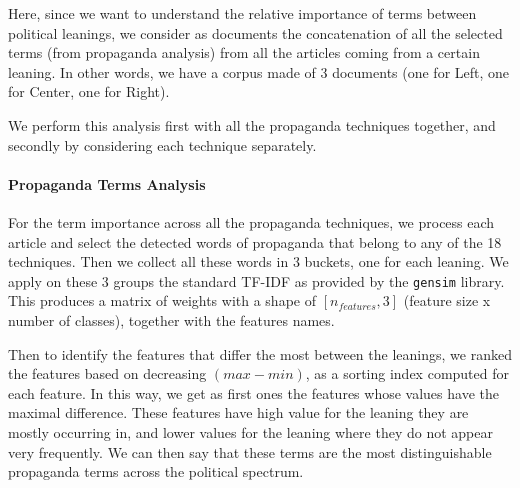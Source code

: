 Here, since we want to understand the relative importance of terms between political leanings, we consider as documents the concatenation of all the selected terms (from propaganda analysis) from all the articles coming from a certain leaning. In other words, we have a corpus made of 3 documents (one for Left, one for Center, one for Right).

We perform this analysis first with all the propaganda techniques together, and secondly by considering each technique separately.

\paragraph{Propaganda Terms Analysis}
For the term importance across all the propaganda techniques, we process each article and select the detected words of propaganda that belong to any of the 18 techniques. Then we collect all these words in 3 buckets, one for each leaning.
We apply on these 3 groups the standard TF-IDF as provided by the \texttt{gensim} library. %
This produces a matrix of weights with a shape of $[n_{features}, 3]$ (feature size x number of classes), together with the features names.

Then to identify the features that differ the most between the leanings, we ranked the features based on decreasing $(max - min)$, as a sorting index computed for each feature. In this way, we get as first ones the features whose values have the maximal difference.
These features have high value for the leaning they are mostly occurring in, and lower values for the leaning where they do not appear very frequently.
We can then say that these terms are the most distinguishable propaganda terms across the political spectrum.

